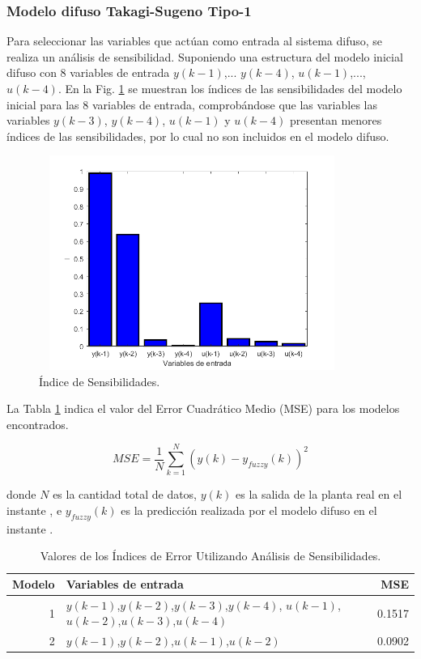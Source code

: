 \documentclass[12pt]{article}
\begin{document}
\subsubsection{Modelo difuso Takagi-Sugeno Tipo-1}

Para seleccionar las variables que actúan como entrada al sistema difuso, se realiza un análisis de sensibilidad. Suponiendo una estructura del modelo inicial difuso con 8 variables de entrada $y(k-1)$,... $y(k-4)$, $u(k-1)$,...,$u(k-4)$. En la Fig. \ref{f_P1Sensibilidad} se muestran los índices de las sensibilidades del modelo inicial para las 8
variables de entrada, comprobándose que las variables las variables $y(k-3)$, $y(k-4)$, $u(k-1)$ y $u(k-4)$ presentan menores índices de las sensibilidades, por lo cual no son incluidos en el modelo difuso.

\begin{figure}
\centering
\includegraphics[width=10cm,height=7cm]{imag/P1Sensibilidad}
\caption{Índice de Sensibilidades.}
\label{f_P1Sensibilidad}
\end{figure}

La Tabla \ref{t_Error} indica el valor del Error Cuadrático Medio (MSE) para los modelos encontrados.


\begin{equation}
MSE=\frac{1}{N}\sum_{k=1}^{N}(y(k)-y_{fuzzy}(k))^2
\label{e_MSE}
\end{equation}

donde $N$ es la cantidad total de datos, $y(k)$ es la salida de la planta real en el instante , e $y_{fuzzy}(k)$ es la predicción realizada por el modelo difuso en el instante .

\begin{table}[htbp]
  \centering
  \caption{Valores de los Índices de Error Utilizando Análisis de Sensibilidades.}
    \begin{tabular}{|r|l|r|}
    \toprule
    \multicolumn{1}{|p{4.055em}|}{Modelo } & \multicolumn{1}{p{5.555em}|}{Variables de entrada } & \multicolumn{1}{p{4.055em}|}{MSE} \\
    \midrule
    1     & $y(k-1)$,$y(k-2)$,$y(k-3)$,$y(k-4)$, $u(k-1)$,$u(k-2)$,$u(k-3)$,$u(k-4)$     & 0.1517 \\
    \midrule
    2     & $y(k-1)$,$y(k-2)$,$u(k-1)$,$u(k-2)$    & 0.0902 \\
    \bottomrule
    \end{tabular}%
  \label{t_Error}%
\end{table}%
\end{document}
